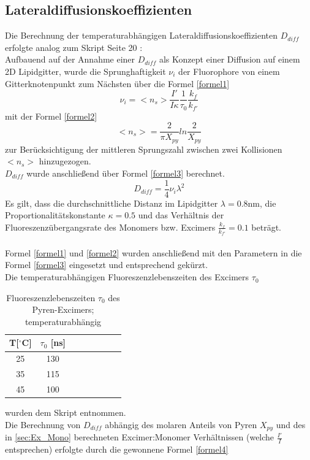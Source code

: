 \subsection{Lateraldiffusionskoeffizienten}
Die Berechnung der temperaturabhängigen Lateraldiffusionskoeffizienten $D_{diff}$ erfolgte analog zum Skript 
Seite 20 \cite{Kursskript} :\\
Aufbauend auf der Annahme einer $D_{diff}$ als Konzept einer Diffusion auf einem 2D Lipidgitter, wurde die 
Sprunghaftigkeit $\nu_i$ der Fluorophore von einem Gitterknotenpunkt zum Nächsten über die Formel \ref{formel1}
\begin{equation}\label{formel1}
\nu_i = <n_s> \frac{I'}{I\kappa}\frac{1}{\tau_0}\frac{k_f}{k_{f'}}
\end{equation}
mit der Formel \ref{formel2} 
\begin{equation}\label{formel2}
<n_s>=\frac{2}{\pi X_{py}}ln\frac{2}{X_{py}}
\end{equation}
zur Berücksichtigung der mittleren Sprungszahl zwischen zwei Kollisionen $<n_s>$  hinzugezogen.\\
$D_{diff}$ wurde anschließend über Formel \ref{formel3} berechnet.
\begin{equation}\label{formel3}
D_{diff}=\frac{1}{4}\nu_i \lambda^2
\end{equation}
Es gilt, dass die durchschnittliche Distanz im Lipidgitter $\lambda=0.8\text{nm}$, die 
Proportionalitätskonstante $\kappa=0.5$ und das Verhältnis der Fluoreszenzübergangsrate des Monomers 
bzw. Excimers $\frac{k_f}{k_{f'}}=0.1$ beträgt.\\\\
Formel \ref{formel1} und \ref{formel2} wurden anschließend mit den Parametern in die Formel \ref{formel3} 
eingesetzt und entsprechend gekürzt. \\
Die temperaturabhängigen Fluoreszenzlebenszeiten des Excimers $\tau_0$
  \begin{table} [h]
 	\footnotesize
 	\begin{center}
 		\caption{Fluoreszenzlebenszeiten $\tau_0$ des Pyren-Excimers; temperaturabhängig}
 		\begin{tabular} {c c c l l l l l}
 			T[$^\circ$C]&  $\tau_0$ [ns] \\ \hline
 			25& 130 \\ \hline 
 			35&	115 \\ \hline 
 			45&	100 \\ \hline 
 		\end{tabular}
 		\label{tab:Lebenszeiten}
 	\end{center}
 \end{table}
wurden dem Skript entnommen.\\
Die Berechnung von $D_{diff}$ abhängig des molaren Anteils von Pyren $X_{py}$ und des in \ref{sec:Ex_Mono} berechneten 
Excimer:Monomer Verhältnissen (welche $\frac{I'}{I}$ entsprechen) erfolgte durch die gewonnene Formel \ref{formel4}


